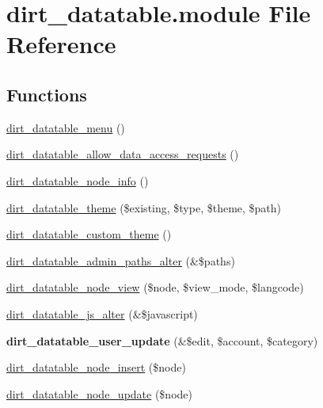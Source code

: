 \hypertarget{dirt__datatable_8module}{}\section{dirt\+\_\+datatable.\+module File Reference}
\label{dirt__datatable_8module}
\subsection*{Functions}
\begin{DoxyCompactItemize}
\item 
\mbox{\hyperlink{dirt__datatable_8module_aceb94a7d2214392b76ff17261701922f}{dirt\+\_\+datatable\+\_\+menu}} ()
\item 
\mbox{\hyperlink{dirt__datatable_8module_abd4284f36dd119f3def0fa10a667130d}{dirt\+\_\+datatable\+\_\+allow\+\_\+data\+\_\+access\+\_\+requests}} ()
\item 
\mbox{\hyperlink{dirt__datatable_8module_a873e280c8a3fce75771fa7b497ef4b2a}{dirt\+\_\+datatable\+\_\+node\+\_\+info}} ()
\item 
\mbox{\hyperlink{dirt__datatable_8module_af6cbe2f7dad25232fb30cd3b3f0f2ce8}{dirt\+\_\+datatable\+\_\+theme}} (\$existing, \$type, \$theme, \$path)
\item 
\mbox{\hyperlink{dirt__datatable_8module_ac057404a34dadf4fdf413e1551353053}{dirt\+\_\+datatable\+\_\+custom\+\_\+theme}} ()
\item 
\mbox{\hyperlink{dirt__datatable_8module_a58ceded2d8f85b17d88806f7793055c0}{dirt\+\_\+datatable\+\_\+admin\+\_\+paths\+\_\+alter}} (\&\$paths)
\item 
\mbox{\hyperlink{dirt__datatable_8module_a1b7091e2ab630bc7df3a6e7709975c6a}{dirt\+\_\+datatable\+\_\+node\+\_\+view}} (\$node, \$view\+\_\+mode, \$langcode)
\item 
\mbox{\hyperlink{dirt__datatable_8module_ac7ad0484e7993d45fd98e1b528c93eb6}{dirt\+\_\+datatable\+\_\+js\+\_\+alter}} (\&\$javascript)
\item 
\mbox{\label{dirt__datatable_8module_a4fa357f23ed51a77ff7619f1ad0ab81c}} 
{\bfseries dirt\+\_\+datatable\+\_\+user\+\_\+update} (\&\$edit, \$account, \$category)
\item 
\mbox{\hyperlink{dirt__datatable_8module_a5d23fdebd313b13e508170c1ed5835c4}{dirt\+\_\+datatable\+\_\+node\+\_\+insert}} (\$node)
\item 
\mbox{\hyperlink{dirt__datatable_8module_a743da8ebbeace0d1b0153531fbe35396}{dirt\+\_\+datatable\+\_\+node\+\_\+update}} (\$node)

\end{DoxyCompactItemize}
